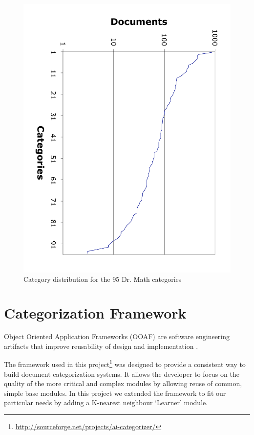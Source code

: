 \documentclass[twocolumn]{article}
\begin{document}
\begin{figure}
\includegraphics[angle=90,width=\linewidth]{cat-distribution}
\caption{Category distribution for the 95 Dr. Math categories}
\label{cat-distribution}
\end{figure}


\section{Categorization Framework}

Object Oriented Application Frameworks (OOAF) are software engineering artifacts 
that improve reusability of design and implementation \cite{fayad:97, fayad:99}.

The framework used in this project\footnote{\url{http://sourceforge.net/projects/ai-categorizer/}}
was designed to provide a 
consistent way to build document categorization systems.\cite{williams:02}  It allows the developer to 
focus on the quality of the more critical and complex modules by allowing reuse of 
common, simple base modules. In this project we extended the framework to fit our 
particular needs by adding a K-nearest neighbour `Learner' module. 
\end{document}
